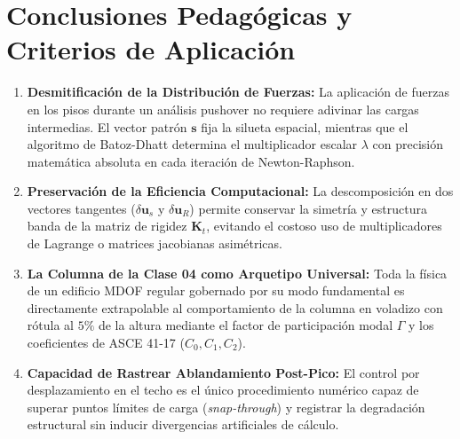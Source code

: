 \documentclass[11pt,letterpaper]{article}
\begin{document}
\section{Conclusiones Pedagógicas y Criterios de Aplicación}

\begin{enumerate}
    \item \textbf{Desmitificación de la Distribución de Fuerzas:} La aplicación de fuerzas en los pisos durante un análisis pushover no requiere adivinar las cargas intermedias. El vector patrón $\mathbf{s}$ fija la silueta espacial, mientras que el algoritmo de Batoz-Dhatt determina el multiplicador escalar $\lambda$ con precisión matemática absoluta en cada iteración de Newton-Raphson.
    \item \textbf{Preservación de la Eficiencia Computacional:} La descomposición en dos vectores tangentes ($\delta \mathbf{u}_s$ y $\delta \mathbf{u}_R$) permite conservar la simetría y estructura banda de la matriz de rigidez $\mathbf{K}_t$, evitando el costoso uso de multiplicadores de Lagrange o matrices jacobianas asimétricas.
    \item \textbf{La Columna de la Clase 04 como Arquetipo Universal:} Toda la física de un edificio MDOF regular gobernado por su modo fundamental es directamente extrapolable al comportamiento de la columna en voladizo con rótula al $5\%$ de la altura mediante el factor de participación modal $\Gamma$ y los coeficientes de ASCE 41-17 ($C_0, C_1, C_2$).
    \item \textbf{Capacidad de Rastrear Ablandamiento Post-Pico:} El control por desplazamiento en el techo es el único procedimiento numérico capaz de superar puntos límites de carga (\textit{snap-through}) y registrar la degradación estructural sin inducir divergencias artificiales de cálculo.
\end{enumerate}
\end{document}
